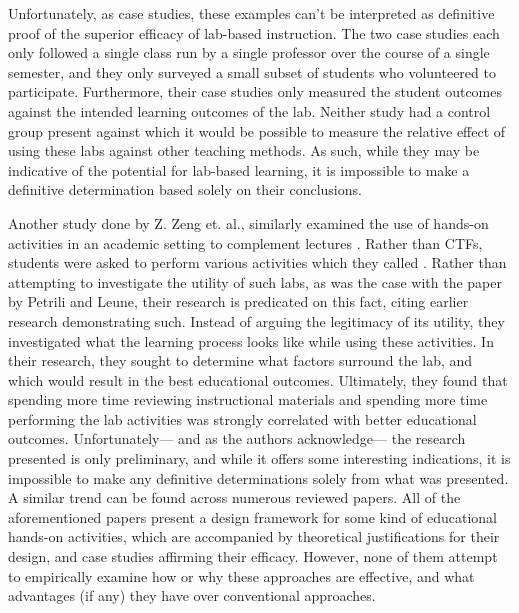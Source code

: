     Unfortunately, as case studies, these examples can't be interpreted as definitive proof of the superior efficacy of lab-based instruction. 
    The two case studies each only followed a single class run by a single professor over the course of a single semester, and they only surveyed a small subset of students who volunteered to participate. %
Furthermore, their case studies only measured the student outcomes against the intended learning outcomes of the lab. %
Neither study had a control group present against which it would be possible to measure the relative effect of using these labs against other teaching methods. %
As such, while they may be indicative of the potential for lab-based learning, it is impossible to make a definitive determination based solely on their conclusions.

    Another study done by Z. Zeng et. al., similarly examined the use of hands-on activities in an academic setting to complement lectures \cite{Z-Zeng}. %
Rather than CTFs, students were asked to perform various activities which they called . %
Rather than attempting to investigate the utility of such labs, as was the case with the paper by Petrili and Leune, their research is predicated on this fact, citing earlier research demonstrating such. %
Instead of arguing the legitimacy of its utility, they investigated what the learning process looks like while using these activities. %
In their research, they sought to determine what factors surround the lab, and which would result in the best educational outcomes. %
Ultimately, they found that spending more time reviewing instructional materials and spending more time performing the lab activities was strongly correlated with better educational outcomes. %
Unfortunately---%
and as the authors acknowledge---%
the research presented is only preliminary, and while it offers some interesting indications, it is impossible to make any definitive determinations solely from what was presented. %
A similar trend can be found across numerous reviewed papers\cite{Y-Deng,W-Du,N-Eliot}. %
All of the aforementioned papers present a design framework for some kind of educational hands-on activities, which are accompanied by theoretical justifications for their design, and case studies affirming their efficacy. %
However, none of them attempt to empirically examine how or why these approaches are effective, and what advantages (if any) they have over conventional approaches. 

